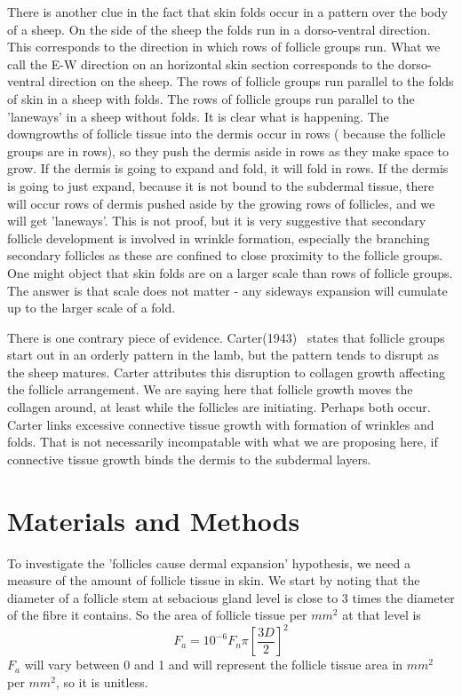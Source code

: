 \documentclass[titlepage]{article}  %
\begin{document}
There is another clue in the fact that skin folds occur in a pattern over the body of a sheep. On the side of the sheep the folds run in a dorso-ventral direction. This corresponds to the direction in which rows of follicle groups run. What we call the E-W direction on an horizontal skin section corresponds to the dorso-ventral direction on the sheep. The rows of follicle groups run parallel to the folds of skin in a sheep with folds. The rows of follicle groups run parallel to the 'laneways' in a sheep without folds. It is clear what is happening. The downgrowths of follicle tissue into the dermis occur in rows ( because the follicle groups are in rows), so they push the dermis aside in rows as they make space to grow. If the dermis is going to expand and fold, it will fold in rows. If the dermis is going to just expand, because it is not bound to the subdermal tissue, there will occur rows of dermis pushed aside by the growing rows of follicles, and we will get 'laneways'. This is not proof, but it is very suggestive that secondary follicle development is involved in wrinkle formation, especially the branching secondary follicles as these are confined to close proximity to the follicle groups. One might object that skin folds are on a larger scale than rows of follicle groups. The answer is that scale does not matter - any sideways expansion will cumulate up to the larger scale of a fold.

There is one contrary piece of evidence. Carter(1943)~\cite{cart:43} states that follicle groups start out in an orderly pattern in the lamb, but the pattern tends to disrupt as the sheep matures. Carter attributes this disruption to collagen growth affecting the follicle arrangement. We are saying here that follicle growth moves the collagen around, at least while the follicles are initiating. Perhaps both occur. Carter links excessive connective tissue growth with formation of wrinkles and folds. That is not necessarily incompatable with what we are proposing here, if connective tissue growth binds the dermis to the subdermal layers.

\section{Materials and Methods}
To investigate  the 'follicles cause dermal expansion' hypothesis, we need a measure of the amount of follicle tissue in skin.
We start by noting that the diameter of a follicle stem at sebacious gland level is close to 3 times the diameter of the fibre it contains. So the area of follicle tissue per $mm^{2}$ at that level is
\begin{displaymath}
F_{a} = 10^{-6} F_{n} \pi \left[\frac{3D}{2}\right]^{2}
\end{displaymath}
$F_{a}$ will vary between 0 and 1 and will represent the follicle tissue area in $mm^{2}$ per $mm^{2}$, so it is unitless.
\end{document}
